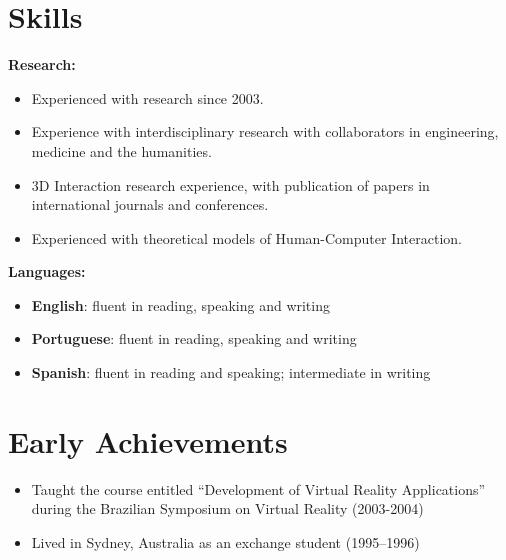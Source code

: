 \documentclass[wideaddress]{vitae}
\let\olditem\item
\def\item{\nopagebreak[4]\olditem}%
\newcommand{\resitem}[1]{
	\item \begin{flushleft} #1 \end{flushleft}
}
\newcommand{\ressubitem}[1]{
	\item \begin{flushleft} #1 \end{flushleft}
}
\newenvironment{reslist}[1]{
	\resitem{\textbf{#1}}
	\begin{itemize}
}{
	\end{itemize}
}
\begin{document}
\section{Skills}
\begin{description}
	\begin{reslist}{Research:}
		\ressubitem{Experienced with research since 2003.}
		\ressubitem{Experience with interdisciplinary research with collaborators in engineering, medicine and the humanities.}
		\ressubitem{3D Interaction research experience, with publication of papers in international journals and conferences.}
		\ressubitem{Experienced with theoretical models of Human-Computer Interaction.}
	\end{reslist}
	\begin{reslist}{Languages:}
		\ressubitem{\textbf{English}: fluent in reading, speaking and writing}
		\ressubitem{\textbf{Portuguese}: fluent in reading, speaking and writing}
		\ressubitem{\textbf{Spanish}: fluent in reading and speaking; intermediate in writing}
	\end{reslist}
\end{description}

\section{Early Achievements}
\begin{itemize}
	\item{Taught the course entitled ``Development of Virtual Reality Applications'' during the Brazilian Symposium on Virtual Reality (2003-2004)}
	\item{Lived in Sydney, Australia as an exchange student  (1995--1996)}
\end{itemize}

%


\end{document}

